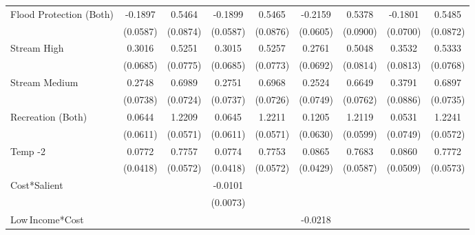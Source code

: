 {\begin{tabular}{l*{8}{c}}
Flood Protection (Both)&  -0.1897\sym{***}&   0.5464\sym{***}&  -0.1899\sym{***}&   0.5465\sym{***}&  -0.2159\sym{***}&   0.5378\sym{***}&  -0.1801\sym{**} &   0.5485\sym{***}\\
                & (0.0587)         & (0.0874)         & (0.0587)         & (0.0876)         & (0.0605)         & (0.0900)         & (0.0700)         & (0.0872)         \\
Stream High     &   0.3016\sym{***}&   0.5251\sym{***}&   0.3015\sym{***}&   0.5257\sym{***}&   0.2761\sym{***}&   0.5048\sym{***}&   0.3532\sym{***}&   0.5333\sym{***}\\
                & (0.0685)         & (0.0775)         & (0.0685)         & (0.0773)         & (0.0692)         & (0.0814)         & (0.0813)         & (0.0768)         \\
Stream Medium   &   0.2748\sym{***}&   0.6989\sym{***}&   0.2751\sym{***}&   0.6968\sym{***}&   0.2524\sym{***}&   0.6649\sym{***}&   0.3791\sym{***}&   0.6897\sym{***}\\
                & (0.0738)         & (0.0724)         & (0.0737)         & (0.0726)         & (0.0749)         & (0.0762)         & (0.0886)         & (0.0735)         \\
Recreation (Both)&   0.0644         &   1.2209\sym{***}&   0.0645         &   1.2211\sym{***}&   0.1205\sym{*}  &   1.2119\sym{***}&   0.0531         &   1.2241\sym{***}\\
                & (0.0611)         & (0.0571)         & (0.0611)         & (0.0571)         & (0.0630)         & (0.0599)         & (0.0749)         & (0.0572)         \\
Temp -2         &   0.0772\sym{*}  &   0.7757\sym{***}&   0.0774\sym{*}  &   0.7753\sym{***}&   0.0865\sym{**} &   0.7683\sym{***}&   0.0860\sym{*}  &   0.7772\sym{***}\\
                & (0.0418)         & (0.0572)         & (0.0418)         & (0.0572)         & (0.0429)         & (0.0587)         & (0.0509)         & (0.0573)         \\
Cost*Salient    &                  &                  &  -0.0101         &                  &                  &                  &                  &                  \\
                &                  &                  & (0.0073)         &                  &                  &                  &                  &                  \\
Low\,Income*Cost &                  &                  &                  &                  &  -0.0218\sym{*}  &                  &                  &                  \\

\end{tabular}}
